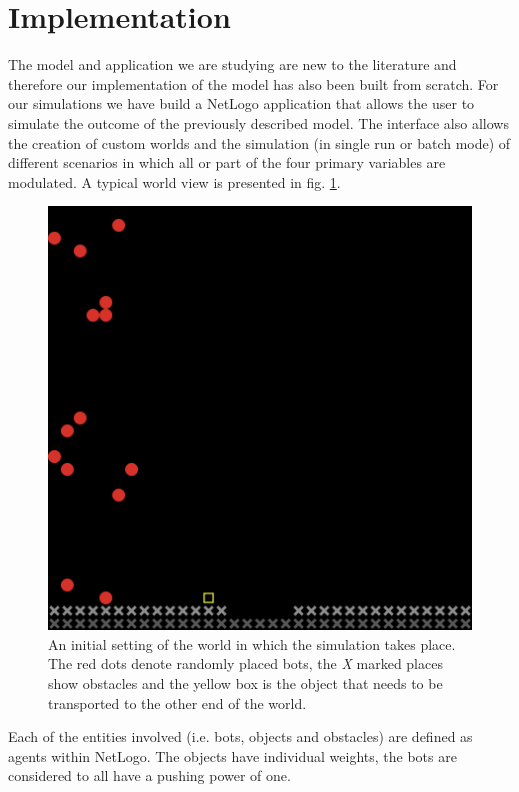 \section{Implementation}
\label{sec:implem}

The model and application we are studying are new to the literature and therefore our implementation of the model has also been built from scratch.  For our simulations we have build a NetLogo application that allows the user to simulate the outcome of the previously described model. The interface also allows the creation of custom worlds and the simulation (in single run or batch mode) of different scenarios in which all or part of the four primary variables are modulated. A typical world view is presented in fig. \ref{fig:world}. 

\begin{figure}[ht]
\centerline{\includegraphics[scale=0.45]{images/world}}
\caption{An initial setting of the world in which the simulation takes place. The red dots denote randomly placed bots, the \emph{X} marked places show obstacles and the yellow box is the object that needs to be transported to the other end of the world.}
\label{fig:world}
\end{figure}

Each of the entities involved (i.e. bots, objects and obstacles) are defined as agents within NetLogo. The objects have individual weights, the bots are considered to all have a pushing power of one. 

